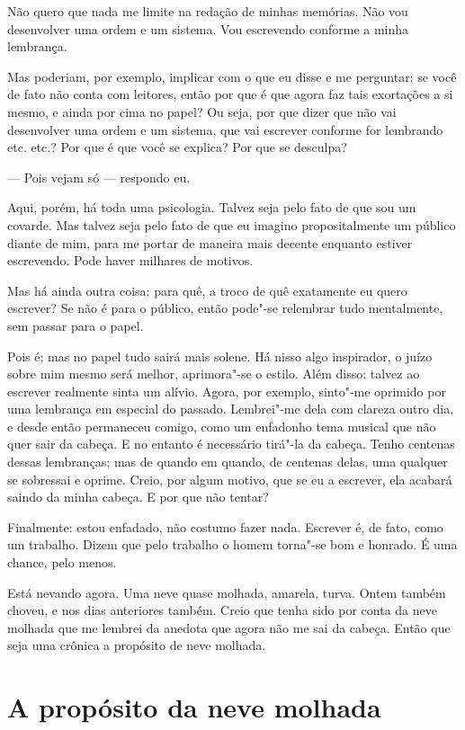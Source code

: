 Não quero que nada me limite na redação de minhas memórias. Não vou
desenvolver uma ordem e um sistema. Vou escrevendo conforme a minha lembrança.

Mas poderiam, por exemplo, implicar com o que eu disse e me perguntar:
se você de fato não conta com leitores, então por que é que agora faz
tais exortações a si mesmo, e ainda por cima no papel? Ou seja, por que
dizer que não vai desenvolver uma ordem e um sistema, que vai escrever
conforme for lembrando etc. etc.? Por que é que você se explica? Por que se
desculpa?

--- Pois vejam só --- respondo eu.

Aqui, porém, há toda uma psicologia. Talvez seja pelo fato de que sou um
covarde. Mas talvez seja pelo fato de que eu imagino propositalmente um
público diante de mim, para me portar de maneira mais decente enquanto
estiver escrevendo. Pode haver milhares de motivos.

Mas há ainda outra coisa: para quê, a troco de quê exatamente eu quero
escrever? Se não é para o público, então pode"-se relembrar tudo
mentalmente, sem passar para o papel.

Pois é; mas no papel tudo sairá mais solene. Há nisso algo inspirador, o
juízo sobre mim mesmo será melhor, aprimora"-se o estilo. Além disso:
talvez ao escrever realmente sinta um alívio. Agora, por exemplo,
sinto"-me oprimido por uma lembrança em especial do passado. Lembrei"-me
dela com clareza outro dia, e desde então permaneceu comigo, como um
enfadonho tema musical que não quer sair da cabeça. E no entanto é
necessário tirá"-la da cabeça. Tenho centenas dessas lembranças; mas de
quando em quando, de centenas delas, uma qualquer se sobressai e
oprime. Creio, por algum motivo, que se eu a escrever, ela acabará
saindo da minha cabeça. E por que não tentar?

Finalmente: estou enfadado, não costumo fazer nada. Escrever é, de fato,
como um trabalho. Dizem que pelo trabalho o homem torna"-se bom e
honrado. É uma chance, pelo menos.

Está nevando agora. Uma neve quase molhada, amarela, turva. Ontem também
choveu, e nos dias anteriores também. Creio que tenha sido por conta da
neve molhada que me lembrei da anedota que agora não me sai da cabeça.
Então que seja uma crônica a propósito de neve molhada.

\chapter{A propósito da neve molhada}

